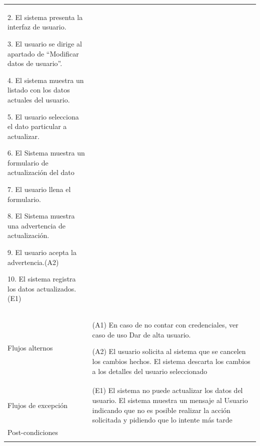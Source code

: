 \begin{longtable}{@{\extracolsep{8pt}}l p{8.5cm}}
 2. El sistema presenta la interfaz de usuario. \par\vspace{.1cm}

 3. El usuario se dirige al apartado de “Modificar datos de usuario”. \par\vspace{.1cm}

 4. El sistema muestra un listado con los datos actuales del usuario. \par\vspace{.1cm}

 5. El usuario selecciona el dato particular a actualizar. \par\vspace{.1cm}

 6. El Sistema muestra un formulario de actualización del dato \par\vspace{.1cm}

 7. El usuario llena el formulario. \par\vspace{.1cm}

 8. El Sistema muestra una advertencia de actualización. \par\vspace{.1cm}

 9. El usuario acepta la advertencia.(A2) \par\vspace{.1cm}

 10. El sistema registra los datos actualizados.(E1) \par\vspace{.1cm}

\\

\hspace{.2cm}Flujos alternos & 
\par (A1) En caso de no contar con credenciales, ver caso de uso Dar de alta usuario.

\par (A2) El usuario solicita al sistema que se cancelen los cambios hechos. El sistema descarta los cambios a los detalles del usuario seleccionado

\par 



\\

\hspace{.2cm}Flujos de excepción & 
\par\vspace{.1cm} (E1) El sistema no puede actualizar los datos del usuario. El sistema muestra un mensaje al Usuario indicando que no es posible realizar la acción solicitada y pidiendo que lo intente más tarde


\\%

\hspace{.2cm}Post-condiciones & 
\\
\hline

 \\
\end{longtable}
